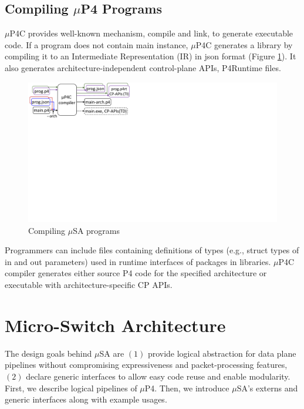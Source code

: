 \documentclass{hotnets19}
\newcommand{\hs}[1]{{\color{blue}{HS:#1}}}
\begin{document}
\subsection*{Compiling $\mu$P4 Programs}
$\mu$P4C provides well-known mechanism, compile and link, to generate executable code.
If a program does not contain main instance, $\mu$P4C generates a library by compiling it to an Intermediate Representation (IR) in json format (Figure \ref{fig:compiling-msa-programs}).
It also generates architecture-independent control-plane APIs, P4Runtime \cite{p4runtime} files.
\begin{figure}
    \centering
    \includegraphics[trim=2 400 565 2, clip,scale=0.5]{mp4c-compiler}
    \caption{Compiling $\mu$SA programs}
\label{fig:compiling-msa-programs}
\end{figure}
Programmers can include files containing definitions of types (e.g., struct types of in and out parameters) used in runtime interfaces of packages in libraries.
$\mu$P4C compiler generates either source P4 code for the specified architecture or executable with architecture-specific CP APIs.

\hs{next we describe msa and mp4c...}



\section{Micro-Switch Architecture}
\label{section:micros-awitch-architecture}
The design goals behind $\mu$SA are $(1)$ provide logical abstraction for data plane pipelines without compromising expressiveness and packet-processing features, $(2)$ declare generic interfaces to allow easy code reuse and enable modularity.
First, we describe logical pipelines of $\mu$P4. Then, we introduce $\mu$SA's externs and generic interfaces along with example usages.
\end{document}
